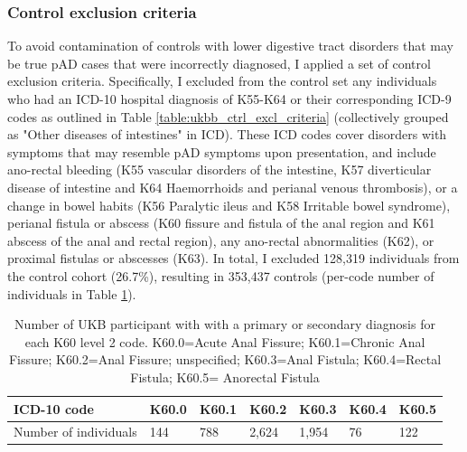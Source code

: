 \subsubsection{Control exclusion criteria}
To avoid contamination of controls with lower digestive tract disorders that may be true pAD cases that were incorrectly diagnosed, I applied a set of control exclusion criteria. Specifically, I excluded from the control set any individuals who had an ICD-10 hospital diagnosis of K55-K64 or their corresponding ICD-9 codes as outlined in Table \ref{table:ukbb_ctrl_excl_criteria} (collectively grouped as "Other diseases of intestines" in ICD). These ICD codes cover disorders with symptoms that may resemble pAD symptoms upon presentation, and include ano-rectal bleeding (K55 vascular disorders of the intestine, K57 diverticular disease of intestine and K64 Haemorrhoids and perianal venous thrombosis), or a change in bowel habits (K56 Paralytic ileus and K58 Irritable bowel syndrome), perianal fistula or abscess (K60 fissure and fistula of the anal region and K61 abscess of the anal and rectal region), any ano-rectal abnormalities (K62), or proximal fistulas or abscesses (K63). In total, I excluded 128,319 individuals from the control cohort (26.7\%), resulting in 353,437 controls (per-code number of individuals in Table \ref{table:ukbb_level2_nums}).



\begin{table}[H]
  \centering
  \caption{Number of UKB participant with with a primary or secondary diagnosis for each K60 level 2 code. K60.0=Acute Anal Fissure; K60.1=Chronic Anal Fissure; K60.2=Anal Fissure; unspecified; K60.3=Anal Fistula; K60.4=Rectal Fistula; K60.5= Anorectal Fistula}
  \label{table:ukbb_level2_nums}
  \begin{tabular}{|l|l|l|l|l|l|l|}
  \hline
  ICD-10 code           & K60.0  & K60.1  & K60.2  & K60.3 & K60.4 & K60.5\\ \hline
  Number of individuals & 144                      & 788                        & 2,624                           & 1,954              & 76                   & 122                     \\ \hline
  \end{tabular}
  \end{table}




